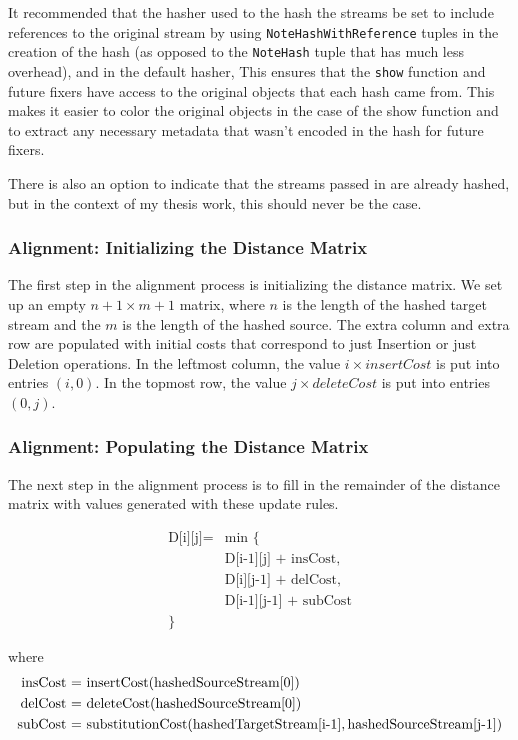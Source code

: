 It recommended that the hasher used to the hash the streams be set to include references to the original stream by using \texttt{NoteHashWithReference} tuples in the creation of the hash (as opposed to the \texttt{NoteHash} tuple that has much less overhead), and in the default hasher,  This ensures that the \texttt{show} function and future fixers have access to the original objects that each hash came from. This makes it easier to color the original objects in the case of the show function and to extract any necessary metadata that wasn't encoded in the hash for future fixers.

There is also an option to indicate that the streams passed in are already hashed, but in the context of my thesis work, this should never be the case. 

\subsubsection{Alignment: Initializing the Distance Matrix}
The first step in the alignment process is initializing the distance matrix. We set up an empty $n+1 \times m+1$ matrix, where $n$ is the length of the hashed target stream and the $m$ is the length of the hashed source. The extra column and extra row are populated with initial costs that correspond to just Insertion or just Deletion operations. In the leftmost column, the value $i \times insertCost$ is put into entries $(i, 0)$. In the topmost row, the value $j \times deleteCost$ is put into entries $(0, j)$. 

\subsubsection{Alignment: Populating the Distance Matrix}
The next step in the alignment process is to fill in the remainder of the distance matrix with values generated with these update rules. 

\begin{equation*}
\begin{split}
\text{D[i][j]} = &  \text{min \{ }\\
& \text{D[i-1][j] + insCost,} \\
& \text{D[i][j-1] + delCost,} \\
& \text{D[i-1][j-1] + subCost} \\
\text{\}}
\end{split}
\end{equation*}


where 
\begin{align*}
	\text{insCost = }  {}& \text{insertCost(hashedSourceStream[0])} \\
	\text{delCost = } {}& \text{deleteCost(hashedSourceStream[0])} \\ 
	\text{subCost = } {}& \text{substitutionCost(}  \text{hashedTargetStream[i-1]},  \-
	\text{hashedSourceStream[j-1])} \\						
\end{align*}

